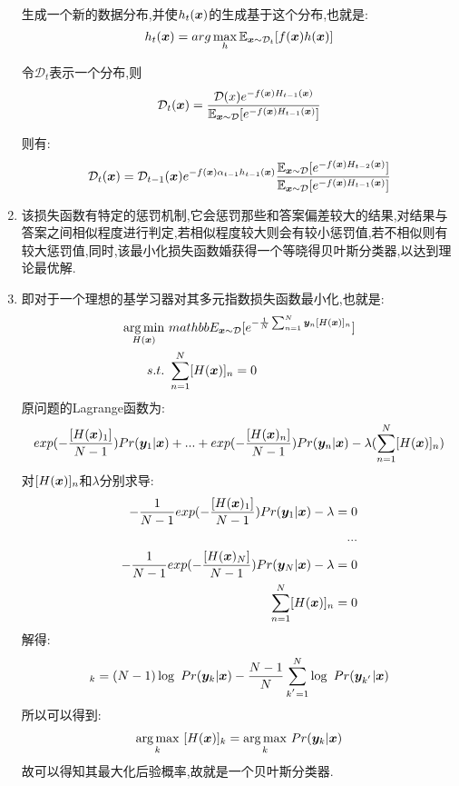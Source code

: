 \documentclass[answers]{exam}  %
\begin{document}
\begin{questions}
\begin{solution}
\begin{enumerate}
			      生成一个新的数据分布,并使$h_t({\boldsymbol{x}})$的生成基于这个分布,也就是:
			      $$
				      h_t({\boldsymbol{x}})=arg \max\limits_{h}\mathbb{E}_{{\boldsymbol{x}}\sim\mathcal{D}_t}[f({\boldsymbol{x}})h({\boldsymbol{x}})]
			      $$

			      令$\mathcal{D}_t$表示一个分布,则
			      $$
				      \mathcal{D}_t({\boldsymbol{x}})=\frac{\mathcal{D}(x)e^{-f({\boldsymbol{x}})H_{t-1}({\boldsymbol{x}})}}{\mathbb{E}_{{\boldsymbol{x}}\sim\mathcal{D}}[e^{-f({\boldsymbol{x}})H_{t-1}({\boldsymbol{x}})}]}
			      $$

			      则有:
			      $$
				      \mathcal{D}_t({\boldsymbol{x}})=\mathcal{D}_{t-1}({\boldsymbol{x}})e^{-f({\boldsymbol{x}})\alpha_{t-1}h_{t-1}({\boldsymbol{x}})}\frac{\mathbb{E}_{{\boldsymbol{x}}\sim\mathcal{D}}[e^{-f({\boldsymbol{x}})H_{t-2}({\boldsymbol{x}})}]}{\mathbb{E}_{{\boldsymbol{x}}\sim\mathcal{D}}[e^{-f({\boldsymbol{x}})H_{t-1}({\boldsymbol{x}})}]}
			      $$
			\item 该损失函数有特定的惩罚机制,它会惩罚那些和答案偏差较大的结果,对结果与答案之间相似程度进行判定,若相似程度较大则会有较小惩罚值,若不相似则有较大惩罚值,同时,该最小化损失函数婚获得一个等晓得贝叶斯分类器,以达到理论最优解.
			\item 即对于一个理想的基学习器对其多元指数损失函数最小化,也就是:
			      \begin{align*}
				      \underset{H({\boldsymbol{x}})}{\mathrm{arg\min}}\  & mathbb{E}_{{\boldsymbol{x}}\sim\mathcal{D}}[e^{-\frac{1}{N} \sum_{n=1}^{N}\boldsymbol{y}_n[H({\boldsymbol{x}})]_n}] \\
				      s.t.\                                 & \sum_{n=1}^{N}[H({\boldsymbol{x}})]_n=0
			      \end{align*}
			      原问题的Lagrange函数为:
			      \begin{align*}
				      exp(-\frac{[H({\boldsymbol{x}})_1]}{N-1} )Pr(\boldsymbol{y}_1|{\boldsymbol{x}})+...+exp(-\frac{[H({\boldsymbol{x}})_n]}{N-1} )Pr(\boldsymbol{y}_n|{\boldsymbol{x}})-\lambda(\sum_{n=1}^{N}[H({\boldsymbol{x}})]_n)
			      \end{align*}
			      对$[H({\boldsymbol{x}})]_n$和$\lambda$分别求导:
			      \begin{align*}
				      -\frac{1}{N-1} exp(-\frac{[H({\boldsymbol{x}})_1]}{N-1} )Pr(\boldsymbol{y}_1|{\boldsymbol{x}})-\lambda=0 \\
				      ...                                                                 \\
				      -\frac{1}{N-1} exp(-\frac{[H({\boldsymbol{x}})_N]}{N-1} )Pr(\boldsymbol{y}_N|{\boldsymbol{x}})-\lambda=0 \\
				      \sum_{n=1}^{N}[H({\boldsymbol{x}})]_n=0
			      \end{align*}
			      解得:
			      \begin{align*}
				      [H(\vx)]_k=(N-1)\log \ Pr(\vy_k|\vx)-\frac{N-1}{N} \sum_{k^{'}=1}^{N}\log \ Pr(\vy_{k^{'}}|\vx)
			      \end{align*}
			      所以可以得到:
			      \begin{align*}
				      \underset{k}{\mathrm{arg \max}}\ [H(\vx)]_k=\underset{k}{\mathrm{arg \max}}\ Pr(\vy_k|\vx)
			      \end{align*}
			      故可以得知其最大化后验概率,故就是一个贝叶斯分类器.
		\end{enumerate}
	\end{solution}


\end{questions}
\end{document}
